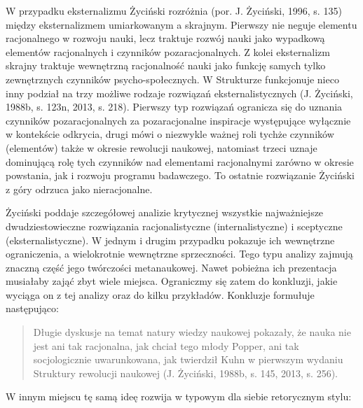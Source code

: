 \documentclass{article}
\begin{document}
W przypadku eksternalizmu Życiński rozróżnia \label{ref:RNDAJVAwcgRgv}(por. J. Życiński, 1996, s. 135) między
eksternalizmem umiarkowanym a skrajnym. Pierwszy nie neguje elementu racjonalnego w rozwoju nauki, lecz traktuje rozwój
nauki jako wypadkową elementów racjonalnych i czynników pozaracjonalnych. Z kolei eksternalizm skrajny traktuje
wewnętrzną racjonalność nauki jako funkcję samych tylko zewnętrznych czynników psycho-społecznych. W Strukturze
funkcjonuje nieco inny podział na trzy możliwe rodzaje rozwiązań eksternalistycznych \label{ref:RNDcwjdYvX9ov}(J.
Życiński, 1988b, s. 123n, 2013, s. 218). Pierwszy typ rozwiązań ogranicza się do uznania czynników pozaracjonalnych za
pozaracjonalne inspiracje występujące wyłącznie w kontekście odkrycia, drugi mówi o niezwykle ważnej roli tychże
czynników (elementów) także w okresie rewolucji naukowej, natomiast trzeci uznaje dominującą rolę tych czynników nad
elementami racjonalnymi zarówno w okresie powstania, jak i rozwoju programu badawczego. To ostatnie rozwiązanie
Życiński z góry odrzuca jako nieracjonalne.

Życiński poddaje szczegółowej analizie krytycznej wszystkie najważniejsze dwudziestowieczne rozwiązania racjonalistyczne
(internalistyczne) i sceptyczne (eksternalistyczne). W jednym i drugim przypadku pokazuje ich wewnętrzne ograniczenia,
a wielokrotnie wewnętrzne sprzeczności. Tego typu analizy zajmują znaczną część jego twórczości metanaukowej. Nawet
pobieżna ich prezentacja musiałaby zająć zbyt wiele miejsca. Ograniczmy się zatem do konkluzji, jakie wyciąga on z tej
analizy oraz do kilku przykładów. Konkluzje formułuje następująco:

\begin{quotation}
Długie dyskusje na temat natury wiedzy naukowej pokazały, że nauka nie jest ani tak racjonalna, jak chciał tego młody
Popper, ani tak socjologicznie uwarunkowana, jak twierdził Kuhn w pierwszym wydaniu Struktury rewolucji naukowej
\label{ref:RNDelOLSePcR6}(J. Życiński, 1988b, s. 145, 2013, s. 256).

\end{quotation}
W innym miejscu tę samą ideę rozwija w typowym dla siebie retorycznym stylu:
\end{document}
